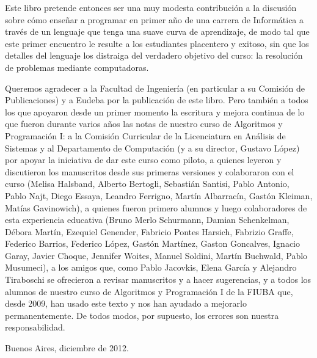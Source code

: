 Este libro pretende entonces ser una muy modesta contribución a la discusión sobre cómo enseñar a 
programar en primer año de una carrera de Informática a través de un lenguaje que tenga una suave 
curva de aprendizaje, de modo tal que este primer encuentro le resulte a los estudiantes placentero 
y exitoso, sin que los detalles del lenguaje los distraiga del verdadero objetivo del curso: la resolución 
de problemas mediante computadoras.


Queremos agradecer a la Facultad de Ingeniería (en particular a su Comisión de Publicaciones) y a 
Eudeba por la publicación de este libro. Pero también a todos los que apoyaron desde un primer momento 
la escritura y mejora continua de lo que fueron durante varios años las notas de nuestro curso de 
Algoritmos y Programación I: a la Comisión Curricular de la Licenciatura en Análisis de Sistemas y al 
Departamento de Computación (y a su director, Gustavo López) por apoyar la iniciativa de dar este curso 
como piloto, a quienes leyeron y discutieron los manuscritos desde sus primeras versiones y colaboraron 
con el curso (Melisa Halsband, Alberto Bertogli, Sebastián Santisi, Pablo Antonio, Pablo Najt, Diego Essaya, 
Leandro Ferrigno, Martín Albarracín, Gastón Kleiman, Matías Gavinowich), a quienes fueron primero alumnos y 
luego colaboradores de esta experiencia educativa (Bruno Merlo Schurmann, Damian Schenkelman, Débora Martín, 
Ezequiel Genender, Fabricio Pontes Harsich, Fabrizio Graffe, Federico Barrios, Federico López, Gastón 
Martínez, Gaston Goncalves, Ignacio Garay, Javier Choque, Jennifer Woites, Manuel Soldini, Martín Buchwald, 
Pablo Musumeci), a los amigos que, como Pablo Jacovkis, Elena García y Alejandro Tiraboschi se ofrecieron a 
revisar manuscritos y a hacer sugerencias, y a todos los alumnos de nuestro curso de Algoritmos y 
Programación I de la FIUBA que, desde 2009, han usado este texto y nos han ayudado a mejorarlo permanentemente. 
De todos modos, por supuesto, los errores son nuestra responsabilidad.


\hfill Buenos Aires, diciembre de 2012.

